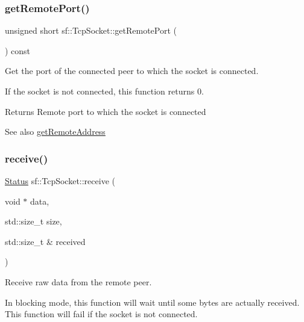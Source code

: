 \subsubsection{\texorpdfstring{getRemotePort()}{getRemotePort()}}
{\footnotesize\ttfamily unsigned short sf\+::\+Tcp\+Socket\+::get\+Remote\+Port (\begin{DoxyParamCaption}{ }\end{DoxyParamCaption}) const}



Get the port of the connected peer to which the socket is connected. 

If the socket is not connected, this function returns 0.

\begin{DoxyReturn}{Returns}
Remote port to which the socket is connected
\end{DoxyReturn}
\begin{DoxySeeAlso}{See also}
\mbox{\hyperlink{classsf_1_1_tcp_socket_aa8579c203b1fd21beb74d7f76444a94c}{get\+Remote\+Address}} \begin{DoxyVerb}\end{DoxyVerb}
 
\end{DoxySeeAlso}
\mbox{\label{classsf_1_1_tcp_socket_a90ce50811ea61d4f00efc62bb99ae1af}} 
\subsubsection{\texorpdfstring{receive()}{receive()}\hspace{0.1cm}{\footnotesize\ttfamily [1/2]}}
{\footnotesize\ttfamily \mbox{\hyperlink{classsf_1_1_socket_a51bf0fd51057b98a10fbb866246176dc}{Status}} sf\+::\+Tcp\+Socket\+::receive (\begin{DoxyParamCaption}\item[{void $\ast$}]{data,  }\item[{std\+::size\+\_\+t}]{size,  }\item[{std\+::size\+\_\+t \&}]{received }\end{DoxyParamCaption})}



Receive raw data from the remote peer. 

In blocking mode, this function will wait until some bytes are actually received. This function will fail if the socket is not connected.


